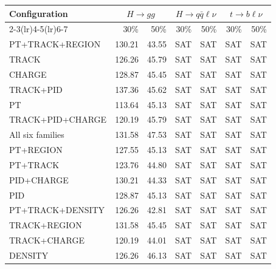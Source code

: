 \begin{table}[htbp]
\centering
\footnotesize
\setlength{\tabcolsep}{2.5pt}
\begin{tabularx}{\linewidth}{@{}Xrrrrrr@{}}
\toprule
Configuration & \multicolumn{2}{c}{$H\to gg$} & \multicolumn{2}{c}{$H\to q\bar q\ell\nu$} & \multicolumn{2}{c}{$t\to b\ell\nu$} \\
\cmidrule(lr){2-3}\cmidrule(lr){4-5}\cmidrule(lr){6-7}
 & 30\% & 50\% & 30\% & 50\% & 30\% & 50\% \\
\midrule
PT+TRACK+REGION & 130.21 & 43.55 & SAT & SAT & SAT & SAT \\ %
TRACK & 126.26 & 45.79 & SAT & SAT & SAT & SAT \\ %
CHARGE & 128.87 & 45.45 & SAT & SAT & SAT & SAT \\ %
TRACK+PID & 137.36 & 45.62 & SAT & SAT & SAT & SAT \\ %
PT & 113.64 & 45.13 & SAT & SAT & SAT & SAT \\ %
TRACK+PID+CHARGE & 120.19 & 45.79 & SAT & SAT & SAT & SAT \\ %
All six families & 131.58 & 47.53 & SAT & SAT & SAT & SAT \\ %
PT+REGION & 127.55 & 45.13 & SAT & SAT & SAT & SAT \\ %
PT+TRACK & 123.76 & 44.80 & SAT & SAT & SAT & SAT \\ %
PID+CHARGE & 130.21 & 44.33 & SAT & SAT & SAT & SAT \\ %
PID & 128.87 & 45.13 & SAT & SAT & SAT & SAT \\ %
PT+TRACK+DENSITY & 126.26 & 42.81 & SAT & SAT & SAT & SAT \\ %
TRACK+REGION & 131.58 & 45.45 & SAT & SAT & SAT & SAT \\ %
TRACK+CHARGE & 120.19 & 44.01 & SAT & SAT & SAT & SAT \\ %
DENSITY & 126.26 & 46.13 & SAT & SAT & SAT & SAT \\ %

\end{tabularx}
\end{table}
